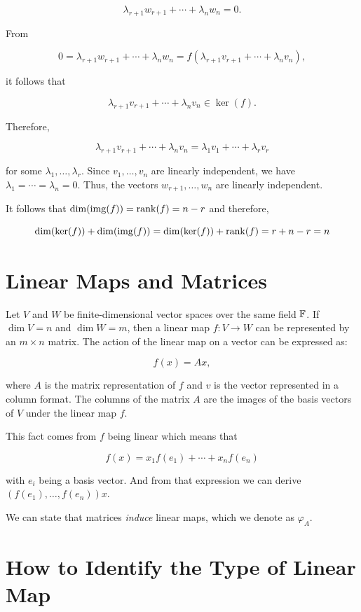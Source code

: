 \[
    \lambda_{r+1}w_{r+1} + \cdots + \lambda_n w_n = 0.
\]
    
From

\[
    0 = \lambda_{r+1}w_{r+1} + \cdots + \lambda_n w_n = f(\lambda_{r+1}v_{r+1} + \cdots + \lambda_n v_n),
\]
    
it follows that

\[
    \lambda_{r+1}v_{r+1} + \cdots + \lambda_n v_n \in \ker(f).
\]
    
Therefore,
    
\[
    \lambda_{r+1}v_{r+1} + \cdots + \lambda_n v_n = \lambda_1v_1 + \cdots + \lambda_r v_r
\]

for some \(\lambda_1, \ldots, \lambda_r\). Since \(v_1, \ldots, v_n\) are linearly independent, 
we have \(\lambda_1 = \cdots = \lambda_n = 0\). Thus, the vectors \(w_{r+1}, \ldots, w_n\) are linearly 
independent.
    
It follows that \(\dim(\mathrm{img}(f)) = \mathrm{rank}(f) = n - r\) and therefore,
    
\[
    \dim(\ker(f)) + \dim(\mathrm{img}(f)) = \dim(\ker(f)) + \mathrm{rank}(f) = r + n - r = n
\]

\QED
  
\section{Linear Maps and Matrices}

Let \( V \) and \( W \) be finite-dimensional vector spaces over the same field \( \mathbb{F} \). 
If \( \dim V = n \) and \( \dim W = m \), then a linear map \( f: V \to W \) can be represented by 
an \( m \times n \) matrix. The action of the linear map on a vector can be expressed as:

\[
    f(x) = Ax,
\]

where \(A\) is the matrix representation of \(f\) and \( v \) is the vector represented in a column 
format. The columns of the matrix \(A\) are the images of the basis vectors of \( V \) under the linear 
map \(f\).

This fact comes from \(f\) being linear which means that 

\[
    f(x) = x_1f(e_1) + \cdots + x_nf(e_n)
\]

with \(e_i\) being a basis vector. And from that expression we can derive \((f(e_1), \dots, f(e_n))x\).

We can state that matrices \emph{induce} linear maps, which we denote as \(\varphi_A\).

\section{How to Identify the Type of Linear Map}

